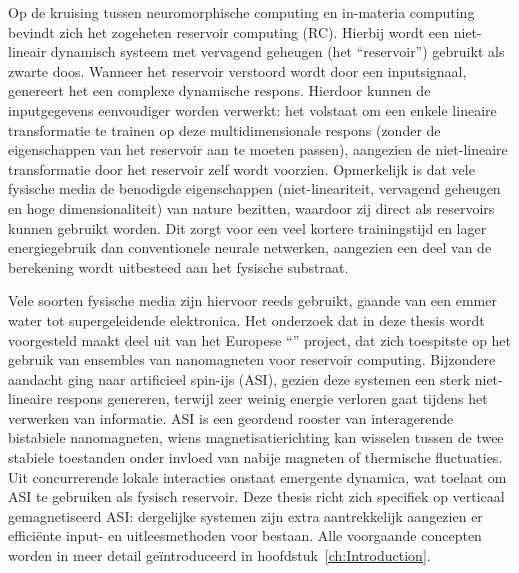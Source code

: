 Op de kruising tussen neuromorphische computing en in-materia computing bevindt zich het zogeheten reservoir computing (RC).
Hierbij wordt een niet-lineair dynamisch systeem met vervagend geheugen (het ``reservoir'') gebruikt als zwarte doos.
Wanneer het reservoir verstoord wordt door een inputsignaal, genereert het een complexe dynamische respons.
Hierdoor kunnen de inputgegevens eenvoudiger worden verwerkt: het volstaat om een enkele lineaire transformatie te trainen op deze multidimensionale respons (zonder de eigenschappen van het reservoir aan te moeten passen), aangezien de niet-lineaire transformatie door het reservoir zelf wordt voorzien. 
Opmerkelijk is dat vele fysische media de benodigde eigenschappen (niet-lineariteit, vervagend geheugen en hoge dimensionaliteit) van nature bezitten, waardoor zij direct als reservoirs kunnen gebruikt worden.
Dit zorgt voor een veel kortere trainingstijd en lager energiegebruik dan conventionele neurale netwerken, aangezien een deel van de berekening wordt uitbesteed aan het fysische substraat. \par
Vele soorten fysische media zijn hiervoor reeds gebruikt, gaande van een emmer water tot supergeleidende elektronica.
Het onderzoek dat in deze thesis wordt voorgesteld maakt deel uit van het Europese ``\spinengine'' project, dat zich toespitste op het gebruik van ensembles van nanomagneten voor reservoir computing.
Bijzondere aandacht ging naar artificieel spin-ijs (ASI), gezien deze systemen een sterk niet-lineaire respons genereren, terwijl zeer weinig energie verloren gaat tijdens het verwerken van informatie.
ASI is een geordend rooster van interagerende bistabiele nanomagneten, wiens magnetisatierichting kan wisselen tussen de twee stabiele toestanden onder invloed van nabije magneten of thermische fluctuaties.
Uit concurrerende lokale interacties onstaat emergente dynamica, wat toelaat om ASI te gebruiken als fysisch reservoir.
Deze thesis richt zich specifiek op verticaal gemagnetiseerd ASI: dergelijke systemen zijn extra aantrekkelijk aangezien er effici\"ente input- en uitleesmethoden voor bestaan.
Alle voorgaande concepten worden in meer detail ge\"introduceerd in hoofdstuk~\ref{ch:Introduction}. \\

